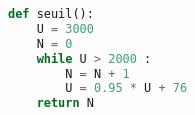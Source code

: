 \begin{center}
\begin{lstlisting}[language=Python]
def seuil():
	U = 3000
	N = 0
	while U > 2000 :
		N = N + 1
		U = 0.95 * U + 76
	return N
\end{lstlisting}
\end{center}
